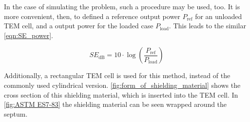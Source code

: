 In the case of simulating the problem, such a procedure may be used, too. It is more convenient, then, to defined a reference output power $P_\mathrm{ref}$ for an unloaded TEM cell, and a output power for the loaded case $P_\mathrm{load}$. This leads to the similar \autoref{eqn:SE_power}.

\begin{equation}
    SE_\mathrm{dB}=10\cdot\log{\left( \frac{P_\mathrm{ref}}{P_\mathrm{load}} \right)}
    \label{eqn:SE_power}
\end{equation}

Additionally, a rectangular TEM cell is used for this method, instead of the commonly used cylindrical version. \autoref{fig:form_of_shielding_material} shows the cross section of this shielding material, which is inserted into the TEM cell. In \autoref{fig:ASTM ES7-83} the shielding material can be seen wrapped around the septum. 

